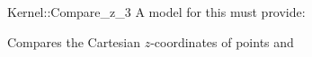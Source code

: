 \begin{ccRefFunctionObjectConcept}{Kernel::Compare_z_3}
A model for this must provide:


      {Compares the Cartesian $z$-coordinates of points  and
      }

\end{ccRefFunctionObjectConcept}
